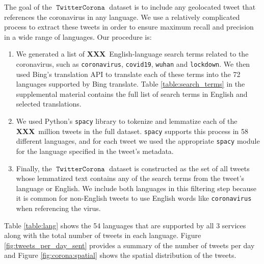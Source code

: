 \documentclass[11pt]{article}
\newcommand{\XXX}{\textbf{XXX}~}
\DeclareMathOperator{\corona}{\texttt{TwitterCorona}}
\begin{document}
The goal of the $\corona$ dataset is to include any geolocated tweet that references the coronavirus in any language.
We use a relatively complicated process to extract these tweets in order to ensure maximum recall and precision in a wide range of languages.
Our procedure is:
\begin{enumerate}
\item
We generated a list of \XXX English-language search terms related to the coronavirus,
such as \texttt{coronavirus}, \texttt{covid19}, \texttt{wuhan} and \texttt{lockdown}.
We then used Bing's translation API to translate each of these terms into the 72 languages supported by Bing translate.
Table \ref{table:search_terms} in the supplemental material contains the full list of search terms in English and selected translations.
\item
We used Python's \texttt{spacy} library \citep{spacy2} to tokenize and lemmatize each of the \XXX million tweets in the full dataset.
\texttt{spacy} supports this process in 58 different languages,
and for each tweet we used the appropriate \texttt{spacy} module for the language specified in the tweet's metadata.
\item
Finally, the $\corona$ dataset is constructed as the set of all tweets whose lemmatized text contains any of the search terms from the tweet's language or English.
We include both languages in this filtering step because it is common for non-English tweets to use English words like \texttt{coronavirus} when referencing the virus.
\end{enumerate}
Table \ref{table:lang} shows the 54 languages that are supported by all 3 services along with the total number of tweets in each language.
Figure \ref{fig:tweets_per_day_sent} provides a summary of the number of tweets per day and Figure \ref{fig:corona:spatial} shows the spatial distribution of the tweets.
\end{document}
